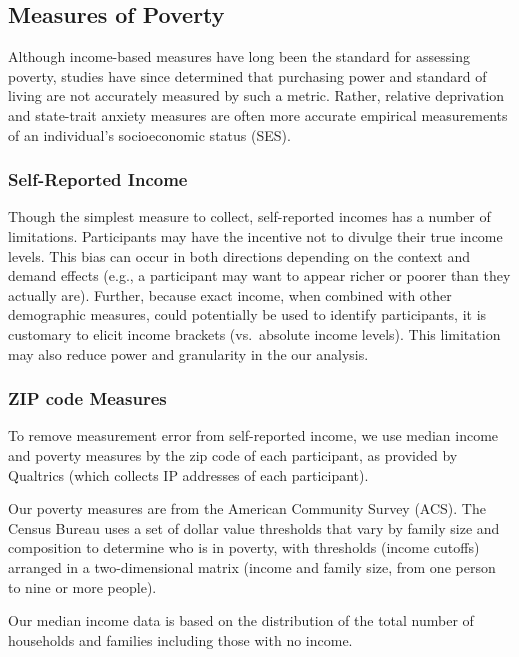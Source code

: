 \documentclass[
]{report}
\begin{document}
\hypertarget{measures-of-poverty}{%
\subsection{Measures of Poverty}\label{measures-of-poverty}}

Although income-based measures have long been the standard for assessing
poverty, studies have since determined that purchasing power and
standard of living are not accurately measured by such a metric. Rather,
relative deprivation and state-trait anxiety measures are often more
accurate empirical measurements of an individual's socioeconomic status
(SES).

\hypertarget{self-reported-income}{%
\subsubsection{Self-Reported Income}\label{self-reported-income}}

Though the simplest measure to collect, self-reported incomes has a
number of limitations. Participants may have the incentive not to
divulge their true income levels. This bias can occur in both directions
depending on the context and demand effects (e.g., a participant may
want to appear richer or poorer than they actually are). Further,
because exact income, when combined with other demographic measures,
could potentially be used to identify participants, it is customary to
elicit income brackets (vs.~absolute income levels). This limitation may
also reduce power and granularity in the our analysis.

\hypertarget{zip-code-measures}{%
\subsubsection{ZIP code Measures}\label{zip-code-measures}}

To remove measurement error from self-reported income, we use median
income and poverty measures by the zip code of each participant, as
provided by Qualtrics (which collects IP addresses of each participant).

Our poverty measures are from the American Community Survey (ACS). The
Census Bureau uses a set of dollar value thresholds that vary by family
size and composition to determine who is in poverty, with thresholds
(income cutoffs) arranged in a two-dimensional matrix (income and family
size, from one person to nine or more people).

Our median income data is based on the distribution of the total number
of households and families including those with no income.
\end{document}
